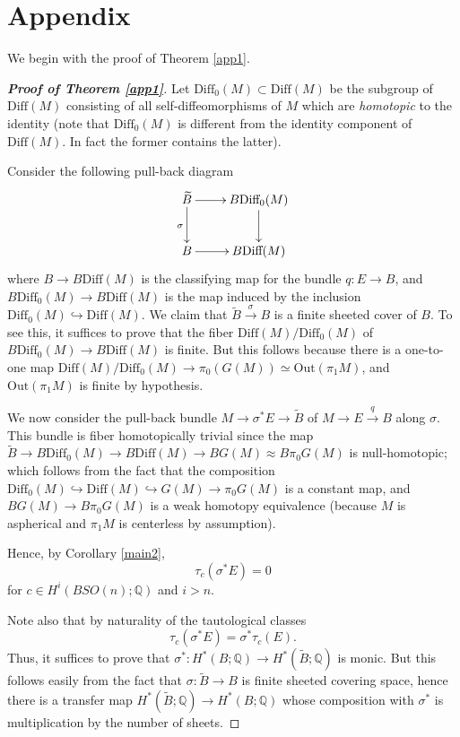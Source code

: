 \documentclass[onecolumn,notitlepage,11pt]{article}
\newcommand{\Q}{\mathbb{Q}}
\newcommand{\Diff}{\mbox{Diff}}
\newcommand{\beq}{\begin{equation*}}
\newcommand{\eeq}{\end{equation*}}
\theoremstyle{definition}
\begin{document}
\section{Appendix}\label{appendix}
We begin with the proof of Theorem \ref{app1}.
\begin{proof}[\textbf{Proof of Theorem \ref{app1}}]
Let $\Diff_0(M)\subset\Diff(M)$ be the subgroup of $\Diff(M)$
consisting
of all self-diffeomorphisms of $M$ which are \textit{homotopic}
to the identity (note that $\Diff_0(M)$ is different 
from the identity component of $\Diff(M)$. In fact the former
contains the latter).

Consider the following pull-back diagram
\beq
\xymatrix{
\widetilde{B}\ar[d]_{\sigma}\ar[r]& B\Diff_0(M)\ar[d]\\
B\ar[r] & B\Diff(M)
}
\eeq
where $B\to B\Diff(M)$ is the classifying map for the bundle
$q:E\to B$, and $B\Diff_0(M)\to B\Diff(M)$ is the map induced by
the inclusion $\Diff_0(M)\hookrightarrow\Diff(M)$. We claim that
$\widetilde{B}\xrightarrow{\sigma}B$ is a finite sheeted 
cover of $B$. To see this, it suffices to
prove that the fiber $\Diff(M)/\Diff_0(M)$ of 
$B\Diff_0(M)\to B\Diff(M)$ is finite. But this follows
because there is a one-to-one map 
$\Diff(M)/\Diff_0(M)\to\pi_0(G(M))\simeq\mbox{Out}(\pi_1M)$, and 
$\mbox{Out}(\pi_1M)$ is finite by hypothesis.

We now consider the pull-back bundle $M\to\sigma^*E\to\widetilde{B}$ of
$M\to E\xrightarrow{q} B$ along $\sigma$. This bundle is fiber
homotopically trivial since the 
map $\widetilde{B}\to B\Diff_0(M)\to B\Diff(M)\to BG(M)\approx B\pi_0G(M)$ 
is null-homotopic; which follows from the fact that the composition
$\Diff_0(M)\hookrightarrow\Diff(M)\hookrightarrow G(M)\to\pi_0G(M)$
is a constant map, and $BG(M)\to B\pi_0G(M)$ is a weak homotopy equivalence (because $M$ is aspherical and $\pi_1M$ is centerless 
by assumption).

Hence, by Corollary \ref{main2}, 
\beq
\tau_c(\sigma^*E)=0
\eeq
for $c\in H^i(BSO(n);\Q)$ and $i>n$.

Note also that by naturality of the tautological classes
\beq
\tau_c(\sigma^*E)=\sigma^*\tau_c(E).
\eeq
Thus, it suffices to prove that 
$\sigma^*:H^*(B;\Q)\to H^*(\widetilde{B};\Q)$ is monic. But this follows
easily 
from the fact that $\sigma:\widetilde{B}\to B$ is finite sheeted covering
space, hence there is a transfer map 
$H^*(\widetilde{B};\Q)\to H^*(B;\Q)$ whose composition with
$\sigma^*$ is multiplication by the number of sheets.
\end{proof}
\end{document}

